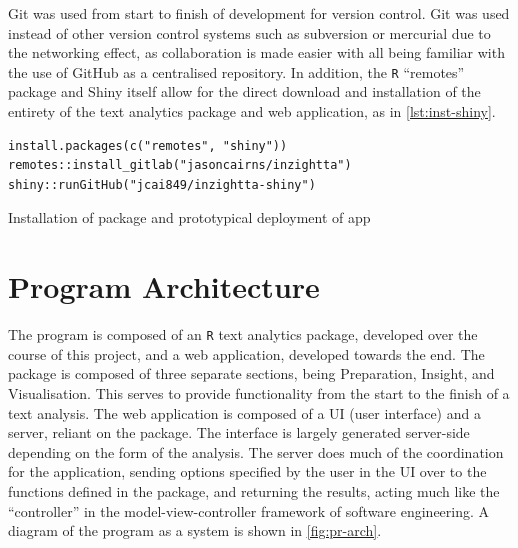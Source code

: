 \documentclass[11pt, a4paper, titlepage]{report}
\begin{document}
Git was used from start to finish of development for version control.
Git was used instead of other version control systems such as
subversion or mercurial due to the networking effect, as collaboration
is made easier with all being familiar with the use of GitHub as a
centralised repository. In addition, the \texttt{R} ``remotes''
package and Shiny itself allow for the direct download and
installation of the entirety of the text analytics package and web
application, as in \underline{\cref{lst:inst-shiny}}.

\begin{listing}[ht]
\begin{verbatim}
install.packages(c("remotes", "shiny"))
remotes::install_gitlab("jasoncairns/inzightta")
shiny::runGitHub("jcai849/inzightta-shiny")
\end{verbatim}
\caption{Installation of package and prototypical deployment of app\label{lst:inst-shiny}}
\end{listing}

\section{Program Architecture}\label{sec:program-architecture-1}

The program is composed of an \texttt{R} text analytics package,
developed over the course of this project, and a web application,
developed towards the end. The package is composed of three separate
sections, being Preparation, Insight, and Visualisation. This serves
to provide functionality from the start to the finish of a text
analysis. The web application is composed of a UI (user interface) and
a server, reliant on the package. The interface is largely generated
server-side depending on the form of the analysis. The server does
much of the coordination for the application, sending options
specified by the user in the UI over to the functions defined in the
package, and returning the results, acting much like the
``controller'' in the model-view-controller framework of software
engineering. A diagram of the program as a system is shown in
\underline{\cref{fig:pr-arch}}.
\end{document}
